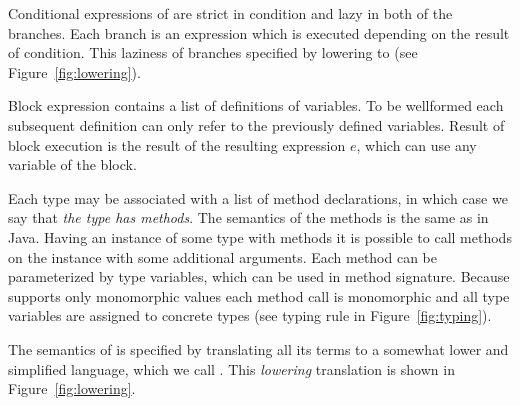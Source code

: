 Conditional expressions of \langname are strict in condition and lazy in both
of the branches. Each branch is an expression which is executed depending on
the result of condition. This laziness of branches specified by lowering to
\corelang (see Figure~\ref{fig:lowering}).

Block expression contains a list of  definitions of variables. To be
wellformed each subsequent definition can only refer to the previously defined
variables. Result of block execution is the result of the resulting
expression $e$, which can use any variable of the block.

Each type may be associated with a list of method declarations, in which case
we say that \emph{the type has methods}. The semantics of the methods is the
same as in Java. Having an instance of some type with methods it is possible
to call methods on the instance with some additional arguments.
Each method can be parameterized by type variables, which
can be used in method signature. Because \langname supports only monomorphic
values each method call is monomorphic and all type variables are assigned to
concrete types (see  typing rule in Figure~\ref{fig:typing}).

The semantics of \langname is specified by translating all its terms to a
somewhat lower and simplified language, which we call \corelang. This
\emph{lowering} translation is shown in Figure~\ref{fig:lowering}. 

